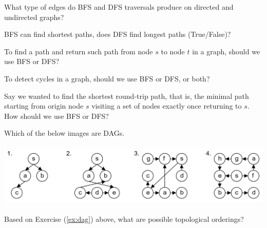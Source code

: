\vspace{.5em}
\begin{Exercise} What type of edges do BFS and DFS traversals produce on directed and undirected graphs?
\end{Exercise}

\vspace{.5em}
\begin{Exercise} BFS can find shortest paths, does DFS find longest paths (True/False)?
\end{Exercise}

\vspace{.5em}
\begin{Exercise} To find a path and return such path from node $s$ to node $t$ in a graph, should we use 
    BFS or DFS?
\end{Exercise}

\vspace{.5em}
\begin{Exercise} To detect cycles in a graph, should we use BFS or DFS, or both?
\end{Exercise}

\vspace{.5em}
\begin{Exercise} Say we wanted to find the shortest round-trip path, that is, the minimal path starting from origin node $s$ visiting a set of
    nodes exactly once returning to $s$. How should we use BFS or DFS?
\end{Exercise}

\vspace{.5em}
\begin{Exercise} Which of the below images are DAGs.

    \label{ex:dag}
    \vspace{1em}
    \hspace{-2em}
    \includegraphics[height=1.2in]{./Sections/graphs/dag/dag_example.png}
\end{Exercise}

\vspace{.5em}
\begin{Exercise} Based on Exercise (\ref{ex:dag}) above, what are possible topological orderings?
\end{Exercise}

